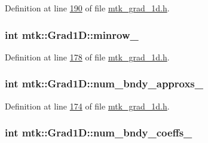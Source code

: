 Definition at line \hyperlink{mtk__grad__1d_8h_source_l00190}{190} of file \hyperlink{mtk__grad__1d_8h_source}{mtk\-\_\-grad\-\_\-1d.\-h}.

\hypertarget{classmtk_1_1Grad1D_a27b8a20e163ad803546592cc3736c12a}{
\subsubsection[{minrow\-\_\-}]{\setlength{\rightskip}{0pt plus 5cm}int mtk\-::\-Grad1\-D\-::minrow\-\_\-\hspace{0.3cm}{\ttfamily [private]}}}\label{classmtk_1_1Grad1D_a27b8a20e163ad803546592cc3736c12a}


Definition at line \hyperlink{mtk__grad__1d_8h_source_l00178}{178} of file \hyperlink{mtk__grad__1d_8h_source}{mtk\-\_\-grad\-\_\-1d.\-h}.

\hypertarget{classmtk_1_1Grad1D_abe15c1ffd9dfaba1a65f4f0e096287ce}{
\subsubsection[{num\-\_\-bndy\-\_\-approxs\-\_\-}]{\setlength{\rightskip}{0pt plus 5cm}int mtk\-::\-Grad1\-D\-::num\-\_\-bndy\-\_\-approxs\-\_\-\hspace{0.3cm}{\ttfamily [private]}}}\label{classmtk_1_1Grad1D_abe15c1ffd9dfaba1a65f4f0e096287ce}


Definition at line \hyperlink{mtk__grad__1d_8h_source_l00174}{174} of file \hyperlink{mtk__grad__1d_8h_source}{mtk\-\_\-grad\-\_\-1d.\-h}.

\hypertarget{classmtk_1_1Grad1D_a60c560882bc601f9ab1d4cd5331e55ef}{
\subsubsection[{num\-\_\-bndy\-\_\-coeffs\-\_\-}]{\setlength{\rightskip}{0pt plus 5cm}int mtk\-::\-Grad1\-D\-::num\-\_\-bndy\-\_\-coeffs\-\_\-\hspace{0.3cm}{\ttfamily [private]}}}\label{classmtk_1_1Grad1D_a60c560882bc601f9ab1d4cd5331e55ef}


